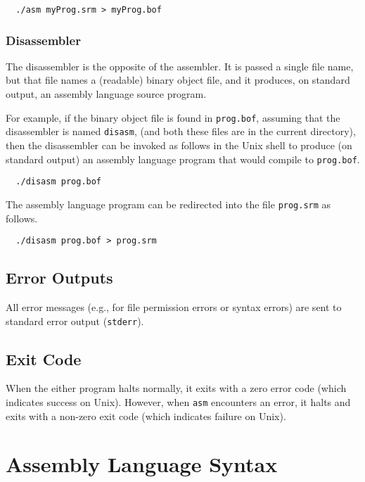 \documentclass[11pt,letterpaper]{article}
\begin{document}
\begin{lstlisting}
  ./asm myProg.srm > myProg.bof
\end{lstlisting}

\subsubsection{Disassembler}

The disassembler is the opposite of the assembler.
It is passed a single file name, but that file names a (readable) binary object
file, and it produces, on standard output,
an assembly language source program.

For example, if the binary object file is found in \texttt{prog.bof},
assuming that the disassembler is named \texttt{disasm},
(and both these files are in the current directory), then the disassembler
can be invoked as follows in the Unix shell to produce (on standard
output) an assembly language program that would compile to \texttt{prog.bof}.

\begin{lstlisting}
  ./disasm prog.bof
\end{lstlisting}

The assembly language program can be redirected into the file \texttt{prog.srm} as follows.

\begin{lstlisting}
  ./disasm prog.bof > prog.srm
\end{lstlisting}

\subsection{Error Outputs}

All error messages (e.g., for file permission errors or syntax errors) 
are sent to standard error output (\texttt{stderr}).

\subsection{Exit Code}

When the either program halts normally, it exits with a zero error code
(which indicates success on Unix).  However, when \texttt{asm}
encounters an error,
it halts and exits with a non-zero exit code
(which indicates failure on Unix).

\section{Assembly Language Syntax}
\end{document}
